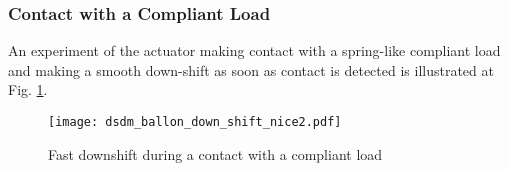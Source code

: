 

\subsubsection{Contact with a Compliant Load}

An experiment of the actuator making contact with a spring-like compliant load and making a smooth down-shift as soon as contact is detected is illustrated at Fig. \ref{fig:dsdm_ballon_down_shift_nice2}. 
%
%

%
%

\begin{figure}[htp]
	\centering
		\texttt{[image: dsdm\_ballon\_down\_shift\_nice2.pdf]}
	\caption{ Fast downshift during a contact with a compliant load }
	\label{fig:dsdm_ballon_down_shift_nice2}
\end{figure}



